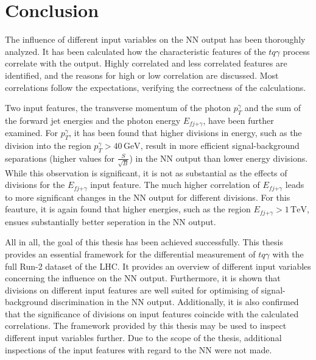 \chapter{Conclusion}
The influence of different input variables on the NN output has been thoroughly analyzed. It has been calculated how the characteristic features of the $tq\gamma$ process 
correlate with the output. Highly correlated and less correlated features are identified, and the reasons for high or low correlation are discussed. 
Most correlations follow the expectations, verifying the correctness of the calculations.

Two input features, the transverse momentum of the photon $p_T^\gamma$ and the sum of the forward jet energies and the photon energy $E_{fj\text{+}\gamma}$, have been further examined. 
For $p_T^\gamma$, it has been found that higher divisions in energy, such as the division into the region $p_T^\gamma > 40 \,\si{\giga\electronvolt}$, result in more efficient signal-background separations (higher values for $\frac{S}{\sqrt{B}}$) in the NN output than lower energy divisions. 
While this observation is significant, it is not as substantial as the effects of divisions for the $E_{fj\text{+}\gamma}$ input feature. The much higher correlation of $E_{fj\text{+}\gamma}$ leads to more significant changes in the NN output for different divisions. 
For this feauture, it is again found that higher energies, such as the region $E_{fj\text{+}\gamma} > 1 \,\si{\tera\electronvolt}$, ensues substantially better seperation in the NN output. 

All in all, the goal of this thesis has been achieved successfully. This thesis provides an essential framework for the differential measurement of $tq\gamma$ with the full Run-2 dataset of the LHC. It provides an overview of different input variables concerning the influence on the NN output. 
Furthermore, it is shown that divisions on different input features are well suited for optimising of signal-background discrimination in the NN output. Additionally, it is also confirmed that the significance of divisions on input features coincide with the calculated correlations. 
The framework provided by this thesis may be used to inspect different input variables further. Due to the scope of the thesis, additional inspections of the input features with regard to the NN were not made.